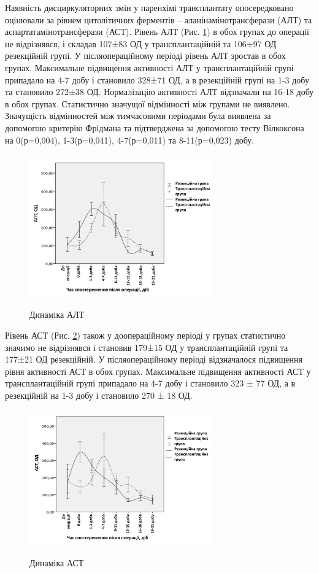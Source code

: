 Наявність дисциркуляторних змін у паренхімі трансплантату опосередковано оцінювали за рівнем цитолітичних ферментів – аланінамінотрансферази (АЛТ) та аспартатамінотрансферази (АСТ). Рівень АЛТ (Рис. \ref{fig:alt}) в обох групах до операції не відрізнявся, і складав 107±83 ОД у трансплантаційній та 106±97 ОД резекційній групі. У післяопераційному періоді рівень АЛТ зростав в обох групах. Максимальне підвищення активності АЛТ у трансплантаційній групі припадало на 4-7 добу і становило 328±71 ОД, а в резекційній групі на 1-3 добу та становило 272±38 ОД. Нормалізацію активності АЛТ відзначали на 16-18 добу в обох групах. Статистично значущої відмінності між групами не виявлено. Значущість відмінностей між тимчасовими періодами була виявлена за допомогою критерію Фрідмана та підтверджена за допомогою тесту Вілкоксона на 0(р=0,004), 1-3(р=0,041), 4-7(р=0,011) та 8-11(р=0,023) добу.

\begin{figure}[h]
\caption{Динаміка АЛТ}
\centering
\includegraphics[width=0.7\textwidth]{Illustrations/graf/alt.jpeg}
\label{fig:alt} 
\end{figure}

Рівень АСТ (Рис. \ref{fig:ast}) також у доопераційному періоді у групах статистично значимо не відрізнявся і становив 179±15 ОД у трансплантаційній групі та 177±21 ОД резекційній. У післяопераційному періоді відзначалося підвищення рівня активності АСТ в обох групах. Максимальне підвищення активності АСТ у трансплантаційній групі припадало на 4-7 добу і становило 323 ± 77 ОД, а в резекційній на 1-3 добу і становило 270 ± 18 ОД.

\begin{figure}[h]
\caption{Динаміка АСТ}
\centering
\includegraphics[width=0.7\textwidth]{Illustrations/graf/ast.jpeg}
\label{fig:ast} 
\end{figure}

